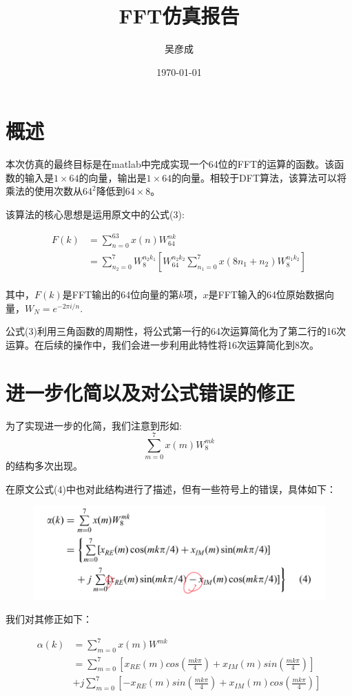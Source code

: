 \documentclass[a4paper, 12pt]{ctexart}
\title{FFT仿真报告}
\author{吴彦成}
\date{\today}
\begin{document}
\maketitle
\section{概述}
本次仿真的最终目标是在matlab中完成实现一个64位的FFT的运算的函数。该函数的输入是$1 \times 64$的向量，输出是$1 \times 64$的向量。相较于DFT算法，该算法可以将乘法的使用次数从$64^2$降低到$64 \times 8$。

该算法的核心思想是运用原文中的公式(3):

\begin{equation*}
    \begin{aligned}
        F(k) &= \sum_{n = 0}^{63} x(n)W_{64}^{nk}\\
        &= \sum_{n_2 = 0}^{7} W_{8}^{n_2k_1}[W_{64}^{n_2k_2} \sum_{n_1 = 0}^{7} x(8n_1 + n_2)W_8^{n_1k_2}]\\
    \end{aligned}
\end{equation*}

其中，$F(k)$是FFT输出的64位向量的第$k$项，$x$是FFT输入的64位原始数据向量，$W_N = e^{-2 \pi i / n}$.

公式(3)利用三角函数的周期性，将公式第一行的64次运算简化为了第二行的16次运算。在后续的操作中，我们会进一步利用此特性将16次运算简化到8次。

\section{进一步化简以及对公式错误的修正}

为了实现进一步的化简，我们注意到形如:
$$\sum_{m = 0}^{7} x(m)W_8^{mk}$$
的结构多次出现。

在原文公式(4)中也对此结构进行了描述，但有一些符号上的错误，具体如下：
\begin{figure}[h]
    \centering
    \includegraphics[width=0.8\linewidth]{4.png}
\end{figure}

我们对其修正如下：

\begin{equation*}
    \begin{aligned}
        \alpha(k) &= \sum_{m=0}^7 x(m)W^{mk}\\
        &= \sum_{m=0}^7 [x_{RE}(m)cos(\frac{mk \pi}{4}) + x_{IM}(m)sin(\frac{mk \pi}{4})]\\
        &+j \sum_{m=0}^7 [-x_{RE}(m)sin(\frac{mk \pi}{4}) + x_{IM}(m)cos(\frac{mk \pi}{4})]
    \end{aligned}
\end{equation*}
\end{document}
